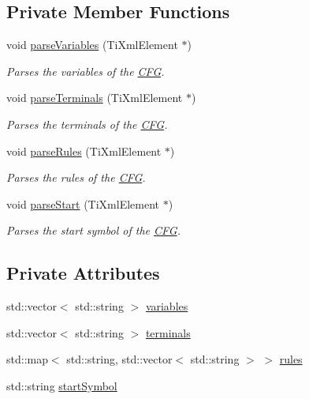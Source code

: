 \subsection*{\-Private \-Member \-Functions}
\begin{DoxyCompactItemize}
\item 
void \hyperlink{classCFGParser_ad743c15b7790fcd172b8a1ef7ece1473}{parse\-Variables} (\-Ti\-Xml\-Element $\ast$)
\begin{DoxyCompactList}\small\item\em \-Parses the variables of the \hyperlink{classCFG}{\-C\-F\-G}. \end{DoxyCompactList}\item 
void \hyperlink{classCFGParser_a525642f6ee69770c435e855e0609fa32}{parse\-Terminals} (\-Ti\-Xml\-Element $\ast$)
\begin{DoxyCompactList}\small\item\em \-Parses the terminals of the \hyperlink{classCFG}{\-C\-F\-G}. \end{DoxyCompactList}\item 
void \hyperlink{classCFGParser_a681f962f987adf57ba9ff8b3638fef14}{parse\-Rules} (\-Ti\-Xml\-Element $\ast$)
\begin{DoxyCompactList}\small\item\em \-Parses the rules of the \hyperlink{classCFG}{\-C\-F\-G}. \end{DoxyCompactList}\item 
void \hyperlink{classCFGParser_a1ca52cabb5cf726a0eb7a2668c3c0a5a}{parse\-Start} (\-Ti\-Xml\-Element $\ast$)
\begin{DoxyCompactList}\small\item\em \-Parses the start symbol of the \hyperlink{classCFG}{\-C\-F\-G}. \end{DoxyCompactList}\end{DoxyCompactItemize}
\subsection*{\-Private \-Attributes}
\begin{DoxyCompactItemize}
\item 
std\-::vector$<$ std\-::string $>$ \hyperlink{classCFGParser_a2be700c7eebe5a1a0fd18b88b3074840}{variables}
\item 
std\-::vector$<$ std\-::string $>$ \hyperlink{classCFGParser_a7242b5a22e08de31297dc9bbb367f5bc}{terminals}
\item 
std\-::map$<$ std\-::string, \*
std\-::vector$<$ std\-::string $>$ $>$ \hyperlink{classCFGParser_a9bea0a4314c8f16ac9aaf0a801a42d86}{rules}
\item 
std\-::string \hyperlink{classCFGParser_a3a51f2f7a2f5342ce9016d226869a516}{start\-Symbol}
\end{DoxyCompactItemize}


